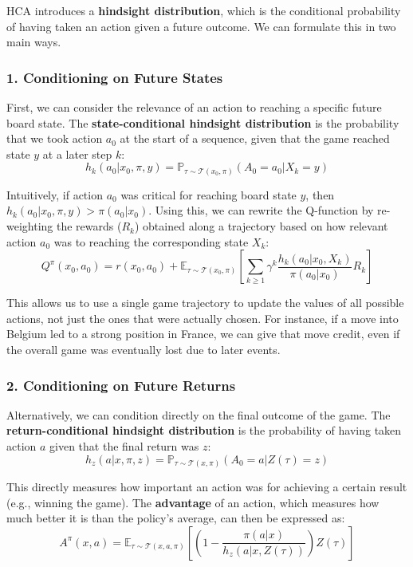 \documentclass[oneside]{memoir}
\begin{document}
HCA introduces a \textbf{hindsight distribution}, which is the conditional probability of having taken an action given a future outcome. We can formulate this in two main ways.

\subsubsection{1. Conditioning on Future States}

First, we can consider the relevance of an action to reaching a specific future board state. The \textbf{state-conditional hindsight distribution} is the probability that we took action $a_0$ at the start of a sequence, given that the game reached state $y$ at a later step $k$:
$$
h_k(a_0|x_0, \pi, y) = \mathbb{P}_{\tau \sim \mathcal{T}(x_0, \pi)}(A_0 = a_0 | X_k = y)
$$

Intuitively, if action $a_0$ was critical for reaching board state $y$, then $h_k(a_0|x_0, \pi, y) > \pi(a_0|x_0)$. Using this, we can rewrite the Q-function by re-weighting the rewards ($R_k$) obtained along a trajectory based on how relevant action $a_0$ was to reaching the corresponding state $X_k$:
$$
Q^{\pi}(x_0, a_0) = r(x_0, a_0) + \mathbb{E}_{\tau \sim \mathcal{T}(x_0, \pi)}\left[\sum_{k \ge 1} \gamma^k \frac{h_k(a_0|x_0, X_k)}{\pi(a_0|x_0)}R_k\right]
$$

This allows us to use a single game trajectory to update the values of all possible actions, not just the ones that were actually chosen. For instance, if a move into Belgium led to a strong position in France, we can give that move credit, even if the overall game was eventually lost due to later events.

\subsubsection{2. Conditioning on Future Returns}

Alternatively, we can condition directly on the final outcome of the game. The \textbf{return-conditional hindsight distribution} is the probability of having taken action $a$ given that the final return was $z$:
$$
h_z(a|x, \pi, z) = \mathbb{P}_{\tau \sim \mathcal{T}(x, \pi)}(A_0 = a | Z(\tau) = z)
$$

This directly measures how important an action was for achieving a certain result (e.g., winning the game). The \textbf{advantage} of an action, which measures how much better it is than the policy's average, can then be expressed as:
$$
A^{\pi}(x, a) = \mathbb{E}_{\tau \sim \mathcal{T}(x, a, \pi)}\left[\left(1 - \frac{\pi(a|x)}{h_z(a|x, Z(\tau))}\right)Z(\tau)\right]
$$
\end{document}
